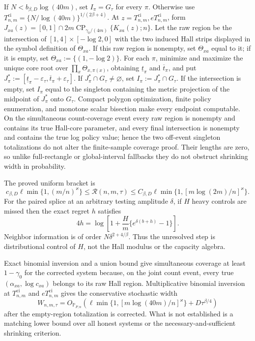 If \(N<b_{\beta,D}\log(40m)\), set \(I_\pi=G_\tau\) for every \(\pi\).  Otherwise use \(T^{\mathrm{ci}}_{n,m}=\{N/\log(40m)\}^{1/(2\beta+4)}\).  At \(z=T^{\mathrm{ci}}_{n,m},eT^{\mathrm{ci}}_{n,m}\), form \(J_{xa}(z)=[0,1]\cap2m\operatorname{CP}_{\gamma_0/(4m)}\{K_{xa}(z);n\}\).  Let the raw region be the intersection of \([1,4]\times[-\log2,0]\) with the two induced Hall strips displayed in the symbol definition of \(\Theta_{xa}\).  If this raw region is nonempty, set \(\Theta_{xa}\) equal to it; if it is empty, set \(\Theta_{xa}:=\{(1,-\log2)\}\).  For each \(\pi\), minimize and maximize the unique core root over \(\prod_x\Theta_{x,\pi(x)}\), obtaining \(\underline t_\pi\) and \(\overline t_\pi\), and put \(J_\pi^*:=[\underline t_\pi-\varepsilon_\tau,\overline t_\pi+\varepsilon_\tau]\).  If \(J_\pi^*\cap G_\tau\neq\varnothing\), set \(I_\pi:=J_\pi^*\cap G_\tau\).  If the intersection is empty, set \(I_\pi\) equal to the singleton containing the metric projection of the midpoint of \(J_\pi^*\) onto \(G_\tau\).  Compact polygon optimization, finite policy enumeration, and monotone scalar bisection make every endpoint computable.  On the simultaneous count-coverage event every raw region is nonempty and contains its true Hall-core parameter, and every final intersection is nonempty and contains the true log policy value; hence the two off-event singleton totalizations do not alter the finite-sample coverage proof.  Their lengths are zero, so unlike full-rectangle or global-interval fallbacks they do not obstruct shrinking width in probability.

The proved uniform bracket is
\[
c_{\beta,D}\ell\min\{1,(m/n)^\varkappa\}
\leq\mathcal R(n,m,\tau)
\leq C_{\beta,D}\ell\min\{1,[m\log(2m)/n]^\varkappa\}.
\]
For the paired splice at an arbitrary testing amplitude \(\delta\), if \(H\) heavy controls are missed then the exact regret \(h\) satisfies
\[
4h=\log\left[1+\frac Hm\{e^{\delta(b+h)}-1\}\right].
\]
Neighbor information is of order \(N\delta^{2+4/\beta}\).  Thus the unresolved step is distributional control of \(H\), not the Hall modulus or the capacity algebra.

Exact binomial inversion and a union bound give simultaneous coverage at least \(1-\gamma_0\) for the corrected system because, on the joint count event, every true \((\alpha_{xa},\log c_{xa})\) belongs to its raw Hall region.  Multiplicative binomial inversion at \(T^{\mathrm{ci}}_{n,m}\) and \(eT^{\mathrm{ci}}_{n,m}\) gives the conservative stochastic width
\[
W_{n,m,\tau}=O_{\mathbb P_{P,n}}\!\left(\ell\min\{1,[m\log(40m)/n]^\varkappa\}+D\tau^{\beta/4}\right)
\]
after the empty-region totalization is corrected.  What is not established is a matching lower bound over all honest systems or the necessary-and-sufficient shrinking criterion.
